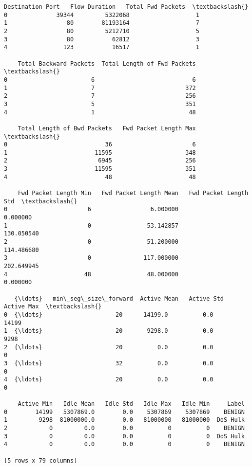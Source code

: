 \documentclass[11pt]{article}
\makeatletter
\newcommand{\boxspacing}{\kern\kvtcb@left@rule\kern\kvtcb@boxsep}
\newcommand{\prompt}[4]{
        {\ttfamily\llap{{\color{#2}[#3]:\hspace{3pt}#4}}\vspace{-\baselineskip}}
    }
\makeatother
\begin{document}
            \begin{tcolorbox}[breakable, size=fbox, boxrule=.5pt, pad at break*=1mm, opacityfill=0]
\prompt{Out}{outcolor}{31}{\boxspacing}
\begin{Verbatim}[commandchars=\\\{\}]
    Destination Port   Flow Duration   Total Fwd Packets  \textbackslash{}
0              39344         5322068                   1
1                 80        81193164                   7
2                 80         5212710                   5
3                 80           62812                   3
4                123           16517                   1

    Total Backward Packets  Total Length of Fwd Packets  \textbackslash{}
0                        6                            6
1                        7                          372
2                        7                          256
3                        5                          351
4                        1                           48

    Total Length of Bwd Packets   Fwd Packet Length Max  \textbackslash{}
0                            36                       6
1                         11595                     348
2                          6945                     256
3                         11595                     351
4                            48                      48

    Fwd Packet Length Min   Fwd Packet Length Mean   Fwd Packet Length Std  \textbackslash{}
0                       6                 6.000000                0.000000
1                       0                53.142857              130.050540
2                       0                51.200000              114.486680
3                       0               117.000000              202.649945
4                      48                48.000000                0.000000

   {\ldots}   min\_seg\_size\_forward  Active Mean   Active Std   Active Max  \textbackslash{}
0  {\ldots}                     20      14199.0          0.0        14199
1  {\ldots}                     20       9298.0          0.0         9298
2  {\ldots}                     20          0.0          0.0            0
3  {\ldots}                     32          0.0          0.0            0
4  {\ldots}                     20          0.0          0.0            0

    Active Min   Idle Mean   Idle Std   Idle Max   Idle Min     Label
0        14199   5307869.0        0.0    5307869    5307869    BENIGN
1         9298  81000000.0        0.0   81000000   81000000  DoS Hulk
2            0         0.0        0.0          0          0    BENIGN
3            0         0.0        0.0          0          0  DoS Hulk
4            0         0.0        0.0          0          0    BENIGN

[5 rows x 79 columns]
\end{Verbatim}
\end{tcolorbox}
        
\end{document}
